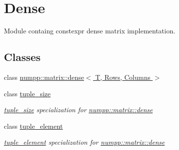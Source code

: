 \hypertarget{group__numpp__structures__matrices__dense}{}\section{Dense}
\label{group__numpp__structures__matrices__dense}


Module containg constexpr dense matrix implementation.  


\subsection*{Classes}
\begin{DoxyCompactItemize}
\item 
class \hyperlink{classnumpp_1_1matrix_1_1dense}{numpp\+::matrix\+::dense$<$ T, Rows, Columns $>$}
\item 
class \hyperlink{classtuple__size}{tuple\+\_\+size}
\begin{DoxyCompactList}\small\item\em \hyperlink{classtuple__size}{tuple\+\_\+size} specialization for \hyperlink{classnumpp_1_1matrix_1_1dense}{numpp\+::matrix\+::dense} \end{DoxyCompactList}\item 
class \hyperlink{classtuple__element}{tuple\+\_\+element}
\begin{DoxyCompactList}\small\item\em \hyperlink{classtuple__element}{tuple\+\_\+element} specialization for \hyperlink{classnumpp_1_1matrix_1_1dense}{numpp\+::matrix\+::dense} \end{DoxyCompactList}\end{DoxyCompactItemize}
